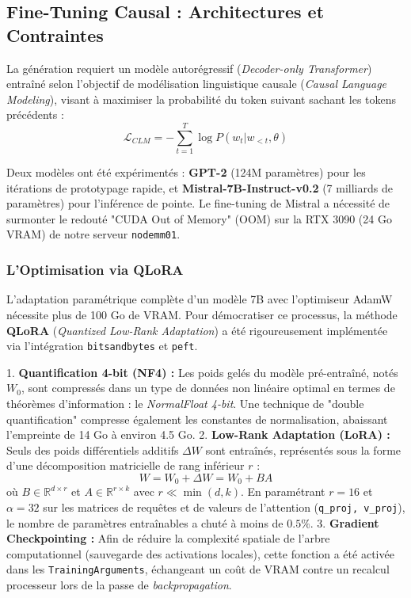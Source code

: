 \documentclass[11pt,a4paper]{article}
\begin{document}
\subsection{Fine-Tuning Causal : Architectures et Contraintes}
La génération requiert un modèle autorégressif (\textit{Decoder-only Transformer}) entraîné selon l'objectif de modélisation linguistique causale (\textit{Causal Language Modeling}), visant à maximiser la probabilité du token suivant sachant les tokens précédents :
\begin{equation}
    \mathcal{L}_{CLM} = -\sum_{t=1}^T \log P(w_t | w_{<t}, \theta)
\end{equation}

Deux modèles ont été expérimentés : \textbf{GPT-2} (124M paramètres) pour les itérations de prototypage rapide, et \textbf{Mistral-7B-Instruct-v0.2} (7 milliards de paramètres) pour l'inférence de pointe. Le fine-tuning de Mistral a nécessité de surmonter le redouté "CUDA Out of Memory" (OOM) sur la RTX 3090 (24 Go VRAM) de notre serveur \texttt{nodemm01}.

\subsubsection{L'Optimisation via QLoRA}
L'adaptation paramétrique complète d'un modèle 7B avec l'optimiseur AdamW nécessite plus de 100 Go de VRAM. Pour démocratiser ce processus, la méthode \textbf{QLoRA} (\textit{Quantized Low-Rank Adaptation}) a été rigoureusement implémentée via l'intégration \texttt{bitsandbytes} et \texttt{peft}.

1. \textbf{Quantification 4-bit (NF4) :} Les poids gelés du modèle pré-entraîné, notés $W_0$, sont compressés dans un type de données non linéaire optimal en termes de théorèmes d'information : le \textit{NormalFloat 4-bit}. Une technique de "double quantification" compresse également les constantes de normalisation, abaissant l'empreinte de 14 Go à environ 4.5 Go.
2. \textbf{Low-Rank Adaptation (LoRA) :} Seuls des poids différentiels additifs $\Delta W$ sont entraînés, représentés sous la forme d'une décomposition matricielle de rang inférieur $r$ :
\begin{equation}
    W = W_0 + \Delta W = W_0 + B A
\end{equation}
où $B \in \mathbb{R}^{d \times r}$ et $A \in \mathbb{R}^{r \times k}$ avec $r \ll \min(d, k)$. En paramétrant $r=16$ et $\alpha=32$ sur les matrices de requêtes et de valeurs de l'attention (\texttt{q\_proj, v\_proj}), le nombre de paramètres entraînables a chuté à moins de $0.5\%$.
3. \textbf{Gradient Checkpointing :} Afin de réduire la complexité spatiale de l'arbre computationnel (sauvegarde des activations locales), cette fonction a été activée dans les \texttt{TrainingArguments}, échangeant un coût de VRAM contre un recalcul processeur lors de la passe de \textit{backpropagation}.
\end{document}
